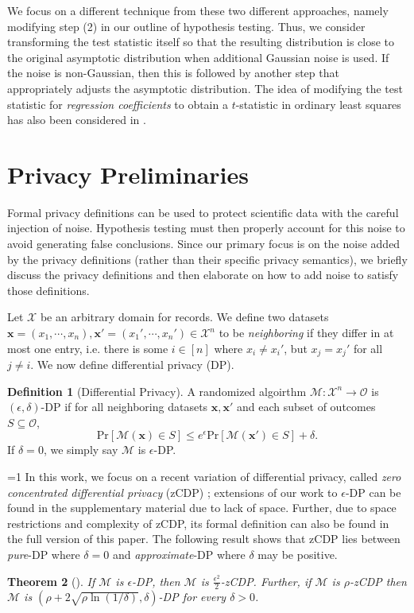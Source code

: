 \documentclass[twoside,letterpaper]{article} \usepackage{aistats2017}
\newtheorem{theorem}{Theorem}[section]
\theoremstyle{definition}
\newtheorem{definition}[theorem]{Definition}
\theoremstyle{remark}
\begin{document}
We focus on a different technique from these two different approaches, namely modifying step (2) in our outline of hypothesis testing.  Thus, we consider transforming the test statistic itself so that the resulting distribution is close to the original asymptotic distribution when additional Gaussian noise is used. If the noise is non-Gaussian, then this is followed by another step that appropriately adjusts the asymptotic distribution.  The idea of modifying the test statistic for  \emph{regression coefficients} to obtain a $t$-statistic in ordinary least squares has also been considered in \cite{Or15}.  

\section{Privacy Preliminaries}\label{sec:privacy}
Formal privacy definitions can be used to protect scientific data with the careful injection of noise. Hypothesis testing must then properly account for this noise to avoid generating false conclusions. Since our primary focus is on the noise added by the privacy definitions (rather than their specific privacy semantics), we briefly discuss the privacy definitions and then elaborate on how to add noise to satisfy those definitions.

Let ${\mathcal{X}}$ be an arbitrary domain for records. We define two datasets ${\mathbf{x}}= (x_1,\cdots, x_n), {\mathbf{x}}'=(x_1',\cdots, x_n') \in {\mathcal{X}}^n$ to be \emph{neighboring} if they differ in at most one entry, i.e. there is some $i \in [n]$ where $x_i \neq x_i'$, but $x_j = x_j'$ for all $j \neq i$. We now define differential privacy (DP)\cite{DMNS06,DKMMN06}.

\begin{definition}[Differential Privacy]
A randomized algoirthm ${\mathcal{M}}: {\mathcal{X}}^n \to {\mathcal{O}}$ is $(\epsilon,\delta)$-DP if for all neighboring datasets ${\mathbf{x}},{\mathbf{x}}'$ and each subset of outcomes $S \subseteq {\mathcal{O}}$, 
$$
{\mathrm{Pr}\left[{{\mathcal{M}}({\mathbf{x}}) \in S}\right]} \leq e^{\epsilon}{\mathrm{Pr}\left[{{\mathcal{M}}({\mathbf{x}}') \in S}\right]} + \delta.
$$
If $\delta = 0$, we simply say ${\mathcal{M}}$ is $\epsilon$-DP.
\end{definition}

=1
In this work, we focus on a recent variation of differential privacy, called \emph{zero concentrated differential privacy} (zCDP) \cite{BS16}; extensions of our work to $\epsilon$-DP can be found in the supplementary material due to lack of space. Further, due to space restrictions and complexity of zCDP, its formal definition can also be found in the full version of this paper.  The following result shows that zCDP lies between \emph{pure}-DP where $\delta =0$ and \emph{approximate}-DP where $\delta$ may be positive.
\begin{theorem}[\citep{BS16}]\label{thm:zcdpcompare}
If ${\mathcal{M}}$ is $\epsilon$-DP, then ${\mathcal{M}}$ is $\frac{\epsilon^2}{2}$-zCDP.  Further, if ${\mathcal{M}}$ is $\rho$-zCDP then ${\mathcal{M}}$ is $(\rho + 2\sqrt{\rho\ln(1/\delta)},\delta)$-DP for every $\delta>0$.  
\label{thm:reduction}
\end{theorem}
\end{document}
